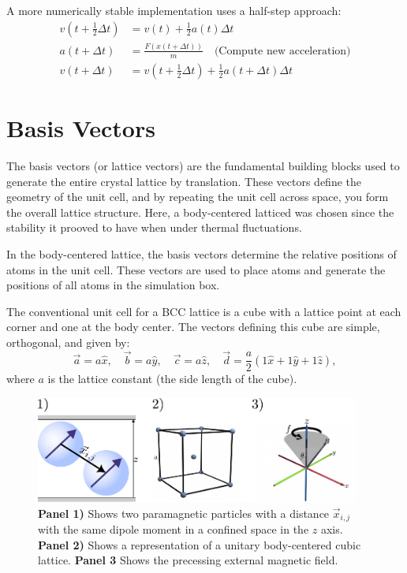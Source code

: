 A more numerically stable implementation uses a half-step approach:
\begin{align}
    v(t+\tfrac{1}{2}\Delta t) &= v(t) + \frac{1}{2}a(t)\Delta t \\
    a(t+\Delta t) &= \frac{F(x(t+\Delta t))}{m} \quad \text{(Compute new acceleration)} \\
    v(t+\Delta t) &= v(t+\tfrac{1}{2}\Delta t) + \frac{1}{2}a(t+\Delta t)\Delta t
    \label{eq:vv_velocity_halfstep}
\end{align}

\section{Basis Vectors}

The basis vectors (or lattice vectors) are the fundamental building blocks used to generate the entire crystal lattice by translation. These vectors define the geometry of the unit cell, and by repeating the unit cell across space, you form the overall lattice structure. Here, a body-centered latticed was chosen since the stability it prooved to have when under thermal fluctuations.

In the body-centered lattice, the basis vectors determine the relative positions of atoms in the unit cell. These vectors are used to place atoms and generate the positions of all atoms in the simulation box.


The conventional unit cell for a BCC lattice is a cube with a lattice point at each corner and one at the body center. The vectors defining this cube are simple, orthogonal, and given by:
%
\begin{equation}
  \vec{a} = a\hat{x}, \quad \vec{b} = a\hat{y}, \quad \vec{c} = a\hat{z}, \quad \vec{d} = \frac{a}{2}\left(  1\hat{x} +  1\hat{y} + 1\hat{z} \right), 
\end{equation}
%
where \( a \) is the lattice constant (the side length of the cube).

\begin{figure}[H]
  \begin{center}
    \includegraphics[width=0.95\textwidth]{figures/methods1.pdf}
  \end{center}
  \caption{\textbf{Panel 1)} Shows two paramagnetic particles with a distance \(\vec{x}_{i,j}\) with the same dipole moment in a confined space in the \( z\) axis. \textbf{Panel 2)} Shows a representation of a  unitary body-centered cubic lattice. \textbf{Panel 3} Shows the precessing external magnetic field.}\label{fig:facecenteredlattice}
\end{figure}

